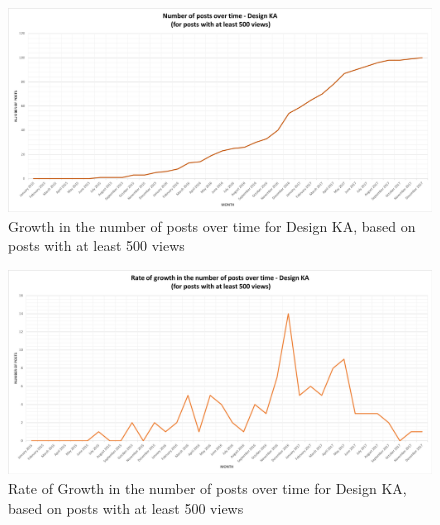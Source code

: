 \documentclass{sigchi}
\begin{document}
\begin{figure}[ht]
	\centering
\includegraphics[width=\textwidth,height=\textheight,keepaspectratio]{RQ5-DesignNumPostsOverTime_500Views.png}
    \caption{Growth in the number of posts over time for Design KA, based on posts with at least 500 views}
    \label{fig:5DesignGrowthInNumPosts500Views}
\end{figure}
\begin{figure}[ht]
	\centering
\includegraphics[width=\textwidth,height=\textheight,keepaspectratio]{RQ5-DesignRateNumPostsOverTime_500Views.png}
    \caption{Rate of Growth in the number of posts over time for Design KA, based on posts with at least 500 views}
    \label{fig:5.1DesignRateGrowthInNumPosts500Views}
\end{figure}
\end{document}
